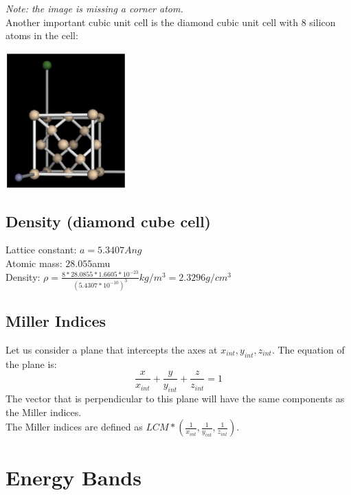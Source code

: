 \documentclass[nobib]{tufte-handout}
\begin{document}
\textit{Note: the image is missing a corner atom.}\\
Another important cubic unit cell is the diamond cubic unit cell with 8 silicon atoms in the cell:
\begin{center}
    \includegraphics[width = 175px]{images/diamond_cube_cell.png}
\end{center}
\subsection{Density (diamond cube cell)}
Lattice constant: $a=5.3407Ang$\\
Atomic mass: $28.055$amu\\
Density: $\rho = \frac{8*28.0855*1.6605*10^{-23}}{(5.4307*10^{-10})^3}kg/m^3 = 2.3296g/cm^3$
\subsection{Miller Indices}
Let us consider a plane that intercepts the axes at $x_{int}, y_{int}, z_{int}$.
The equation of the plane is:
\begin{equation*}
    \frac{x}{x_{int}}+\frac{y}{y_{int}}+\frac{z}{z_{int}} = 1
\end{equation*}
The vector that is perpendicular to this plane will have the same components as the Miller indices.\\
The Miller indices are defined as $LCM*(\frac{1}{x_{int}},\frac{1}{y_{int}},\frac{1}{z_{int}})$.
\section{Energy Bands}
\end{document}
